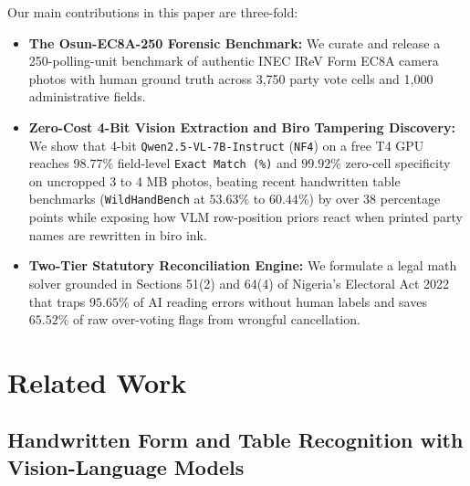 \documentclass{article}
\begin{document}
Our main contributions in this paper are three-fold:
\begin{itemize}
    \item \textbf{The Osun-EC8A-250 Forensic Benchmark:} We curate and release a 250-polling-unit benchmark of authentic INEC IReV Form EC8A camera photos with human ground truth across 3,750 party vote cells and 1,000 administrative fields.
    \item \textbf{Zero-Cost 4-Bit Vision Extraction and Biro Tampering Discovery:} We show that 4-bit \texttt{Qwen2.5-VL-7B-Instruct} (\texttt{NF4}) on a free T4 GPU reaches $98.77\%$ field-level \texttt{Exact Match (\%)} and $99.92\%$ zero-cell specificity on uncropped 3 to 4 MB photos, beating recent handwritten table benchmarks (\texttt{WildHandBench} at $53.63\%$ to $60.44\%$) by over 38 percentage points while exposing how VLM row-position priors react when printed party names are rewritten in biro ink.
    \item \textbf{Two-Tier Statutory Reconciliation Engine:} We formulate a legal math solver grounded in Sections 51(2) and 64(4) of Nigeria's Electoral Act 2022 that traps $95.65\%$ of AI reading errors without human labels and saves $65.52\%$ of raw over-voting flags from wrongful cancellation.
\end{itemize}

\section{Related Work}

\subsection{Handwritten Form and Table Recognition with Vision-Language Models}
\end{document}
